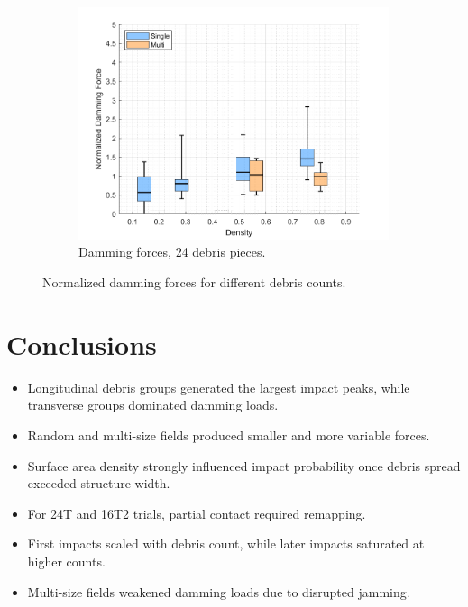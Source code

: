 \documentclass{article}
\begin{document}
\begin{figure}[htbp]
    \hfill
    \begin{subfigure}[b]{0.32\textwidth}
        \centering
        \includegraphics[width=\textwidth]{Boxplot_Density_vs_Damming_24Debris.png}
        \caption{Damming forces, 24 debris pieces.}
        \label{fig:boxplot_damming_24}
    \end{subfigure}
    \caption{Normalized damming forces for different debris counts.}
    \label{fig:boxplots_damming_side_by_side}
\end{figure}



\section{Conclusions}
\begin{itemize}
    \item Longitudinal debris groups generated the largest impact peaks, while transverse groups dominated damming loads.
    \item Random and multi-size fields produced smaller and more variable forces.
    \item Surface area density strongly influenced impact probability once debris spread exceeded structure width.
    \item For 24T and 16T2 trials, partial contact required remapping.
    \item First impacts scaled with debris count, while later impacts saturated at higher counts.
    \item Multi-size fields weakened damming loads due to disrupted jamming.
\end{itemize}
\end{document}
